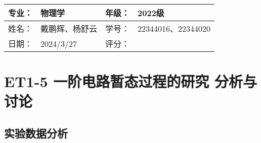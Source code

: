 \documentclass[dvipsnames, svgnames,a4paper,11pt]{article}
\begin{document}
	
	
	
	
	
	\clearpage
	
	\begin{table}
		\renewcommand\arraystretch{1.7}
		\begin{tabularx}{\textwidth}{|X|X|X|X|}
			\hline
			专业：& 物理学 &年级：& 2022级\\
			\hline
			姓名： & 戴鹏辉、杨舒云 & 学号：& 22344016、22344020\\
			\hline
			日期：& 2024/3/27 & 评分： &\\
			\hline
		\end{tabularx}
	\end{table}
	
	\section{ET1-5 一阶电路暂态过程的研究 \quad\heiti 分析与讨论}
	
	\subsection{实验数据分析}
	
\end{document}
